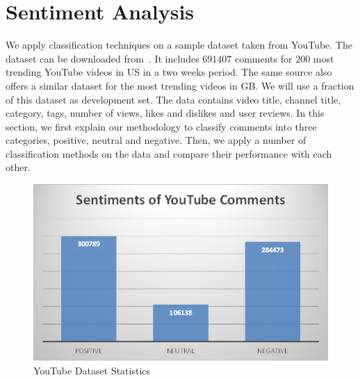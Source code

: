 \section{Sentiment Analysis}
\label{sec:sentiment}
We apply classification techniques on a sample dataset taken from YouTube. The dataset can be downloaded from~\cite{youtubedata}. 
It includes $691407$ comments for $200$ most trending YouTube videos in US in a two weeks period. The same source also offers a similar dataset for the most trending videos in GB. We will use a fraction of this dataset as development set. The data contains video title, channel title, category, tags, number of views, likes and dislikes and user reviews. In this section, we first explain our methodology to classify comments into three categories, positive, neutral and negative. Then, we apply a number of classification methods on the data and compare their performance with each other. 

\begin{figure}%
\centering
\includegraphics[width=0.6\columnwidth]{figures/datastats.png}%
\caption{YouTube Dataset Statistics}%
\label{fig:datastats}%
\end{figure}

